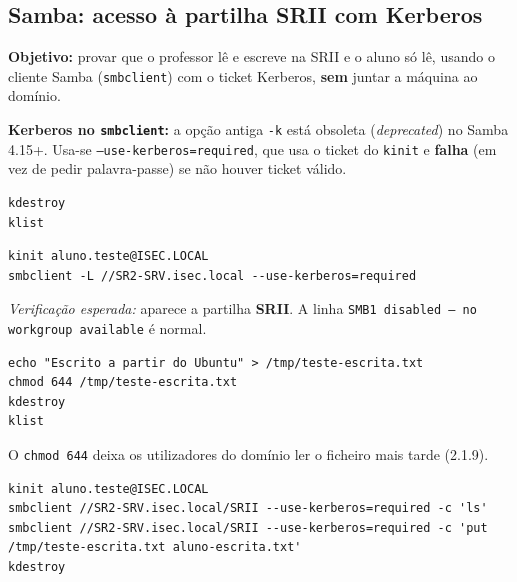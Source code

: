 
\subsection[Samba: acesso à partilha SRII com Kerberos]{Samba: acesso à partilha SRII com Kerberos}


\textbf{Objetivo:} provar que o professor lê e escreve na SRII e o aluno só lê, usando o cliente Samba (\texttt{smbclient}) com o ticket Kerberos, \textbf{sem} juntar a máquina ao domínio.

\begin{importantebox}[title={Importante}]
\textbf{Kerberos no \texttt{smbclient}:} a opção antiga \texttt{-k} está obsoleta (\emph{deprecated}) no Samba 4.15+. Usa-se \texttt{--use-kerberos=required}, que usa o ticket do \texttt{kinit} e \textbf{falha} (em vez de pedir palavra-passe) se não houver ticket válido.
\end{importantebox}


\begin{lstlisting}[style=bashstyle]
kdestroy
klist
\end{lstlisting}


\begin{lstlisting}[style=bashstyle]
kinit aluno.teste@ISEC.LOCAL
smbclient -L //SR2-SRV.isec.local --use-kerberos=required
\end{lstlisting}

\emph{Verificação esperada:} aparece a partilha \textbf{SRII}. A linha \texttt{SMB1 disabled -- no workgroup available} é normal.


\begin{lstlisting}[style=bashstyle]
echo "Escrito a partir do Ubuntu" > /tmp/teste-escrita.txt
chmod 644 /tmp/teste-escrita.txt
kdestroy
klist
\end{lstlisting}

O \texttt{chmod 644} deixa os utilizadores do domínio ler o ficheiro mais tarde (2.1.9).


\begin{lstlisting}[style=bashstyle]
kinit aluno.teste@ISEC.LOCAL
smbclient //SR2-SRV.isec.local/SRII --use-kerberos=required -c 'ls'
smbclient //SR2-SRV.isec.local/SRII --use-kerberos=required -c 'put /tmp/teste-escrita.txt aluno-escrita.txt'
kdestroy
\end{lstlisting}

